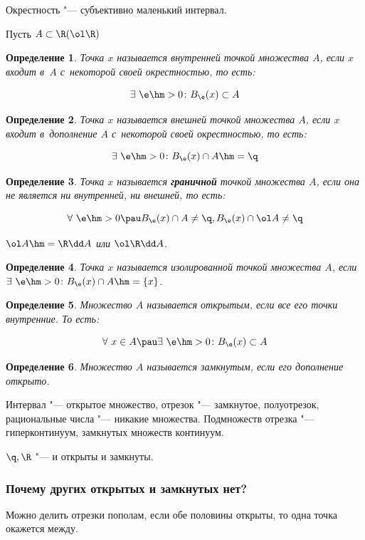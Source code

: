 \documentclass[a4paper,10pt,twoside]{article}
\newtheorem{Def}{Определение}[section]
\begin{document}
Окрестность "--- субъективно маленький интервал.

Пусть $A\subset\R(\ol\R)$

\begin{Def}
    Точка $x$ называется внутренней точкой множества $A$, если $x$ входит в~$A$  с~некоторой своей окрестностью, то есть:

    \[
        \exists\ \e\hm>0\colon B_\e(x)\subset A
    \]
\end{Def}

\begin{Def}
    Точка $x$ называется внешней точкой множества $A$, если $x$ входит в~дополнение $A$ с~некоторой своей окрестностью, то есть:

    \[
        \exists\  \e\hm>0\colon B_\e(x)\cap A\hm=\q
    \]
\end{Def}

\begin{Def}
    Точка $x$ называется \textbf{граничной} точкой множества $A$, если она не является ни внутренней, ни внешней, то есть:

    \[
        \forall\  \e\hm>0\pau B_\e(x)\cap A\neq\q, B_\e(x)\cap\ol A\neq\q
    \]

    $\ol A\hm=\R\dd A$ или $\ol\R\dd A$.
\end{Def}

\begin{Def}
    Точка $x$ называется изолированной точкой множества $A$, если $\exists\ \e\hm>0\colon B_\e(x)\cap A\hm=\{x\}$.
\end{Def}

\begin{Def}
    Множество $A$ называется открытым, если все его точки внутренние. То есть:

    \[
        \forall\  x\in A\pau\exists\  \e\hm>0\colon B_\e(x)\subset A
    \]

\end{Def}

\begin{Def}
    Множество $A$ называется замкнутым, если его дополнение открыто.
\end{Def}

Интервал "--- открытое множество, отрезок "--- замкнутое, полуотрезок, рациональные числа "--- никакие множества. Подмножеств отрезка "--- гиперконтинуум,
 замкнутых множеств континуум.

$\q,\R$ "--- и открыты и замкнуты.

\subsubsection*{Почему других открытых и замкнутых нет?} Можно делить отрезки пополам, если обе половины открыты, то одна точка окажется между.
\end{document}
